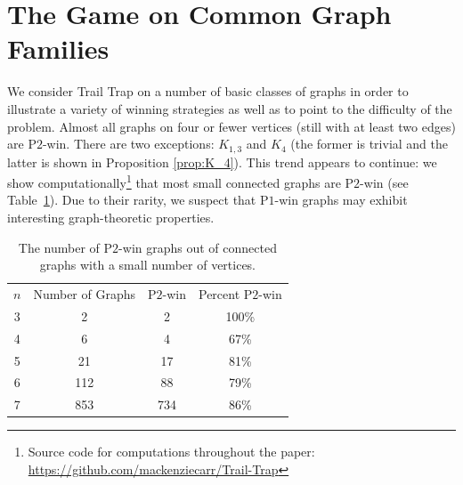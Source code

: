 \documentclass{article}
\theoremstyle{plain}
\theoremstyle{definition}
\def\pone{{\rm{P}\ensuremath{1}}}
\def\ptwo{{\rm{P}\ensuremath{2}}}
\begin{document}
\section{The Game on Common Graph Families}\label{sec solved families}

We consider {\sc Trail Trap} on a number of basic classes of graphs in order to illustrate a variety of winning strategies as well as to point to the difficulty of the problem. Almost all graphs on four or fewer vertices (still with at least two edges) are \ptwo{}-win. There are two exceptions: $K_{1,3}$ and $K_4$ (the former is trivial and the latter is shown in Proposition \ref{prop:K_4}). This trend appears to continue: we show computationally\footnote{Source code for computations throughout the paper: \url{https://github.com/mackenziecarr/Trail-Trap}} that most small connected graphs are \ptwo{}-win (see Table~\ref{tab:small-graphs}). Due to their rarity, we suspect that \pone{}-win graphs may exhibit interesting graph-theoretic properties.

\begin{table}[htb]
\begin{center}
\begin{tabular}{ c c c c}
 $n$ & Number of Graphs & \ptwo{}-win & Percent \ptwo{}-win \\ 
 3 & 2 & 2 & 100\% \\  
 4 & 6 & 4 & 67\% \\  
 5 & 21 & 17 & 81\% \\  
 6 & 112 & 88 & 79\% \\  
 7 & 853 & 734 & 86\% \\  
\end{tabular}
\end{center}
    \caption{The number of \ptwo{}-win graphs out of connected graphs with a small number of vertices.}
    \label{tab:small-graphs}
\end{table}
\end{document}
